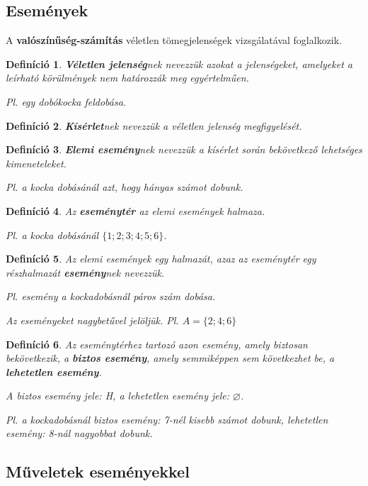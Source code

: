 \documentclass[12pt,a4paper]{article}
\newtheorem{definition}{Definíció} [section]
\begin{document}
\subsection{Események}
A \textbf{valószínűség-számítás} véletlen tömegjelenségek vizsgálatával foglalkozik.

\begin{definition}
\textbf{Véletlen jelenség}nek nevezzük azokat a jelenségeket, amelyeket a leírható körülmények nem határozzák meg egyértelműen.

Pl. egy dobókocka feldobása.
\end{definition}

\begin{definition}
\textbf{Kísérlet}nek nevezzük a véletlen jelenség megfigyelését.
\end{definition}

\begin{definition}
\textbf{Elemi esemény}nek nevezzük a kísérlet során bekövetkező lehetséges kimeneteleket.

Pl. a kocka dobásánál azt, hogy hányas számot dobunk.
\end{definition}

\begin{definition}
Az \textbf{eseménytér} az elemi események halmaza.

Pl. a kocka dobásánál $\{1; 2; 3; 4; 5; 6\}$.
\end{definition}

\begin{definition}
Az elemi események egy halmazát, azaz az eseménytér egy részhalmazát \textbf{esemény}nek nevezzük.

Pl. esemény a kockadobásnál páros szám dobása.

Az eseményeket nagybetűvel jelöljük. Pl. $A = \{2; 4; 6\}$
\end{definition}

\begin{definition}
Az eseménytérhez tartozó azon esemény, amely biztosan bekövetkezik, a \textbf{biztos esemény}, amely semmiképpen sem következhet be, a \textbf{lehetetlen esemény}.

A biztos esemény jele: H, a lehetetlen esemény jele: $\varnothing$.

Pl. a kockadobásnál biztos esemény: 7-nél kisebb számot dobunk, lehetetlen esemény: 8-nál nagyobbat dobunk.
\end{definition}

\subsection{Műveletek eseményekkel}
\end{document}
